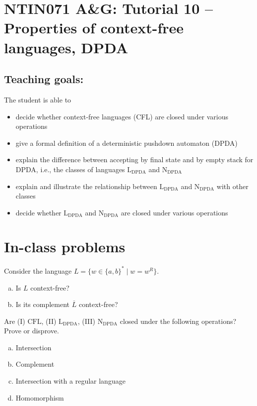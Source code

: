 \documentclass[a4paper,12pt]{amsart}
\begin{document}
\thispagestyle{empty}

\section*{NTIN071 A\&G: Tutorial 10 -- Properties of context-free languages, DPDA}

\medskip

\subsection*{Teaching goals:} The student is able to

    \begin{itemize}\setlength{\itemsep}{0pt}
        \item decide whether context-free languages (CFL) are closed under various operations
        \item give a formal definition of a deterministic pushdown automaton (DPDA)
        \item explain the difference between accepting by final state and by empty stack for DPDA, i.e., the classes of languages $\mathrm{L_{DPDA}}$ and $\mathrm{N_{DPDA}}$
        \item explain and illustrate the relationship between $\mathrm{L_{DPDA}}$ and $\mathrm{N_{DPDA}}$ with other classes
        \item decide whether $\mathrm{L_{DPDA}}$ and $\mathrm{N_{DPDA}}$ are closed under various operations
    \end{itemize}


\section*{In-class problems}


\begin{problem}
    Consider the language $L=\{w\in\{a,b\}^*\mid w=w^R\}$.
    \begin{enumerate}[(a)]
        \item Is $L$ context-free?
        \item Is its complement $\overline{L}$ context-free?
    \end{enumerate}
\end{problem}


\begin{problem}
    Are (I) $\mathrm{CFL}$, (II) $\mathrm{L_{DPDA}}$, (III) $\mathrm{N_{DPDA}}$ closed under the following operations? Prove or disprove.
    \begin{multicols}{2}
        \begin{enumerate}[(a)]
            \item Intersection
            \item Complement
            \item Intersection with a regular language
            \item Homomorphism
        \end{enumerate}
    \end{multicols}    
\end{problem}
\end{document}
